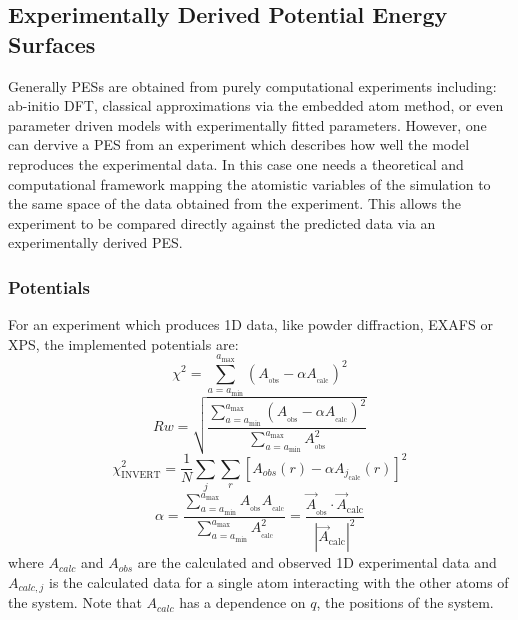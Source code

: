 \subsection{Experimentally Derived Potential Energy Surfaces}
Generally PESs are obtained from purely computational experiments including: ab-initio DFT, classical approximations via the embedded atom method, or even parameter driven models with experimentally fitted parameters.
However, one can dervive a PES from an experiment which describes how well the model reproduces the experimental data.
In this case one needs a theoretical and computational framework mapping the atomistic variables of the simulation to the same space of the data obtained from the experiment.
This allows the experiment to be compared directly against the predicted data via an experimentally derived PES.
\subsubsection{Potentials}
For an experiment which produces 1D data, like powder diffraction, EXAFS or XPS, the implemented potentials are:
\begin{equation} \label{chi}
\chi^{2} = 
\sum_{a=a_\mathrm{min}}^{a_\mathrm{max}} \left(A_{_\mathrm{obs}} - \alpha A_{_\mathrm{calc}}\right)^{2}
\end{equation}
\begin{equation}\label{Rw}
Rw = 
\sqrt{\frac{\sum_{a=a_\mathrm{min}}^{a_\mathrm{max}} \left(A_{_\mathrm{obs}} - \alpha A_{_\mathrm{calc}}\right)^{2}}{\sum_{a=a_\mathrm{min}}^{a_\mathrm{max}} A_{_\mathrm{obs}}^{2}}}
\end{equation}
\begin{equation}\label{INVERT}
  \chi^{2}_{\mathrm{INVERT}} = \frac{1}{N}\sum_{j}\sum_{r}[A_{obs}(r) - \alpha A_{j_\mathrm{calc}}(r)]^{2}
\end{equation}
\begin{equation} \label{alpha}
\alpha  = \frac{\sum_{a=a_\mathrm{min}}^{a_\mathrm{max}}A_\mathrm{_\mathrm{obs}}A_{_\mathrm{calc}}}{\sum_{a=a_\mathrm{min}}^{a_\mathrm{max}} A_{_\mathrm{calc}}^{2}} = \frac{\vec{A}_{_\mathrm{obs}}\cdot\vec{A}_\mathrm{calc}}{|\vec{A}_\mathrm{calc}|^{2}}
\end{equation}
where $A_{calc}$ and $A_{obs}$ are the calculated and observed 1D experimental data
and $A_{calc, j}$ is the calculated data for a single atom interacting with the other atoms of the system. 
Note that $A_{calc}$ has a dependence on $q$, the positions of the system.

